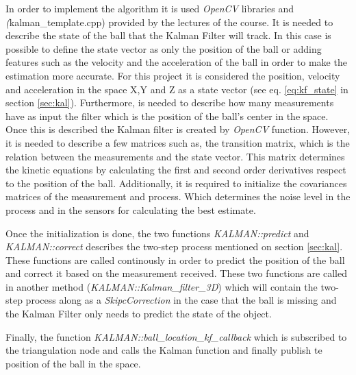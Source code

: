 In order to implement the algorithm it is used \textit{OpenCV} libraries and \textit(kalman\_template.cpp) provided by the lectures of the course. It is needed to describe the state of the ball that the Kalman Filter will track. In this case is possible to define the state vector as only the position of the ball or adding features such as the velocity and the acceleration of the ball in order to make the estimation more accurate. For this project it is considered the position, velocity and acceleration in the space X,Y and Z as a state vector (see eq. \ref{eq:kf_state} in section \ref{sec:kal}). Furthermore, is needed to describe how many measurements have as input the filter which is the position of the ball's center in the space. Once this is described the Kalman filter is created by \textit{OpenCV} function. However, it is needed to describe a few matrices such as, the transition matrix, which is the relation between the measurements and the state vector. This matrix determines the kinetic equations  by calculating the first and second order derivatives respect to the position of the ball. Additionally, it is required to initialize the covariances matrices of the measurement and process. Which determines the noise level in the process and in the sensors for calculating the best estimate.

Once the initialization is done, the two functions \textit{KALMAN::predict} and
\textit{KALMAN::correct} describes the two-step process mentioned on section \ref{sec:kal}. These functions are called continously in order to predict the position of the ball and correct it based on the measurement received. These two functions are called in another method (\textit{KALMAN::Kalman\_filter\_3D}) which will contain the two-step process along as a \textit{SkipcCorrection} in the case that the ball is missing and the Kalman Filter only needs to predict the state of the object.

Finally, the function \textit{KALMAN::ball\_location\_kf\_callback} which is subscribed to the triangulation node and calls the Kalman function and finally publish te position of the ball in the space.



